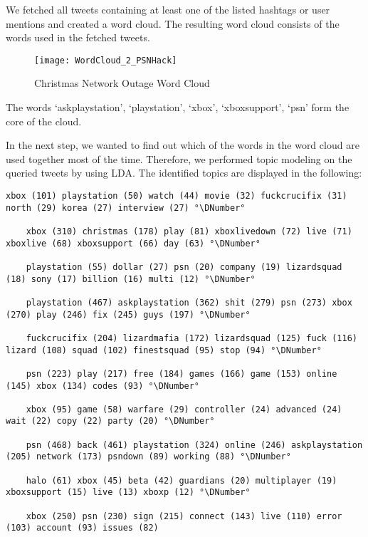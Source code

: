 We fetched all tweets containing at least one of the listed hashtags or user mentions and created a word cloud. The resulting word cloud consists of the words used in the fetched tweets.

\begin{figure}[H]
  \centering
        \texttt{[image: WordCloud\_2\_PSNHack]}
  \caption[Christmas Network Outage Word Cloud]{Christmas Network Outage Word Cloud}
  \label{fig:christmas-network-outage-word-cloud}
  \vspace{-1.3em}
\end{figure}

The words ‘askplaystation’, ‘playstation’, ‘xbox’, ‘xboxsupport’, ‘psn’ form the core of the cloud.

In the next step, we wanted to find out which of the words in the word cloud are used together most of the time. Therefore, we performed topic modeling on the queried tweets by using LDA.
The identified topics are displayed in the following:

\begin{lstlisting}[caption={[Topic Model for Christmas Network Outage] Topic Model for Christmas Network Outage}, label={lst:topic-model-network}, float=h]
	xbox (101) playstation (50) watch (44) movie (32) fuckcrucifix (31) north (29) korea (27) interview (27) °\DNumber°

	xbox (310) christmas (178) play (81) xboxlivedown (72) live (71) xboxlive (68) xboxsupport (66) day (63) °\DNumber°

	playstation (55) dollar (27) psn (20) company (19) lizardsquad (18) sony (17) billion (16) multi (12) °\DNumber°

	playstation (467) askplaystation (362) shit (279) psn (273) xbox (270) play (246) fix (245) guys (197) °\DNumber°

	fuckcrucifix (204) lizardmafia (172) lizardsquad (125) fuck (116) lizard (108) squad (102) finestsquad (95) stop (94) °\DNumber°

	psn (223) play (217) free (184) games (166) game (153) online (145) xbox (134) codes (93) °\DNumber°

	xbox (95) game (58) warfare (29) controller (24) advanced (24) wait (22) copy (22) party (20) °\DNumber°

	psn (468) back (461) playstation (324) online (246) askplaystation (205) network (173) psndown (89) working (88) °\DNumber°

	halo (61) xbox (45) beta (42) guardians (20) multiplayer (19) xboxsupport (15) live (13) xboxp (12) °\DNumber°

	xbox (250) psn (230) sign (215) connect (143) live (110) error (103) account (93) issues (82) 
\end{lstlisting}

